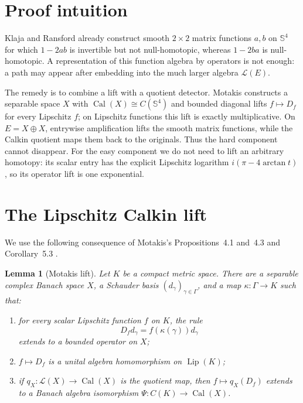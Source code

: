 \documentclass[11pt]{article}
\newtheorem{lemma}{Lemma}
\theoremstyle{remark}
\newcommand{\Sph}{\mathbb S}
\newcommand{\cL}{\mathcal L}
\newcommand{\Cal}{\operatorname{Cal}}
\begin{document}
\section{Proof intuition}

Klaja and Ransford already construct smooth $2\times2$ matrix functions
$a,b$ on $\Sph^4$ for which $1-2ab$ is invertible but not null-homotopic,
whereas $1-2ba$ is null-homotopic.  A representation of this function
algebra by operators is not enough: a path may appear after embedding into
the much larger algebra $\cL(E)$.

The remedy is to combine a lift with a quotient detector.  Motakis
constructs a separable space $X$ with $\Cal(X)\cong C(\Sph^4)$ and bounded
diagonal lifts $f\mapsto D_f$ for every Lipschitz $f$; on Lipschitz
functions this lift is exactly multiplicative.  On $E=X\oplus X$, entrywise
amplification lifts the smooth matrix functions, while the Calkin quotient
maps them back to the originals.  Thus the hard component cannot disappear.
For the easy component we do not need to lift an arbitrary homotopy: its
scalar entry has the explicit Lipschitz logarithm
$i(\pi-4\arctan t)$, so its operator lift is one exponential.

\section{The Lipschitz Calkin lift}

We use the following consequence of Motakis's Propositions~4.1 and~4.3 and
Corollary~5.3 \cite{Motakis}.

\begin{lemma}[Motakis lift]\label{lem:lift}
Let $K$ be a compact metric space.  There are a separable complex Banach
space $X$, a Schauder basis $(d_\gamma)_{\gamma\in\Gamma}$, and a map
$\kappa:\Gamma\to K$ such that:
\begin{enumerate}[label=\textup{(\roman*)},leftmargin=1.05cm]
\item for every scalar Lipschitz function $f$ on $K$, the rule
\[
 D_f d_\gamma=f(\kappa(\gamma))d_\gamma
\]
extends to a bounded operator on $X$;
\item $f\mapsto D_f$ is a unital algebra homomorphism on
$\operatorname{Lip}(K)$;
\item if $q_X:\cL(X)\to\Cal(X)$ is the quotient map, then
$f\mapsto q_X(D_f)$ extends to a Banach algebra isomorphism
$\Psi:C(K)\to\Cal(X)$.
\end{enumerate}
\end{lemma}
\end{document}
